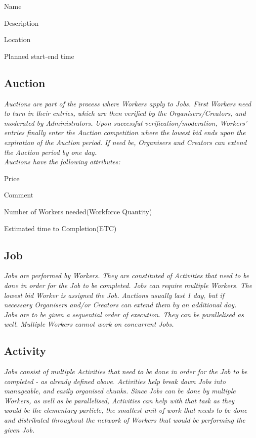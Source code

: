 		\begin{packed_enum}
			\item Name
			\item Description
			\item Location
			\item Planned start-end time
		\end{packed_enum}
		
		\subsection{Auction}
		\textit{Auctions are part of the process where Workers apply to Jobs. First Workers need to turn in their entries, which are then verified by the Organisers/Creators, and moderated by Administrators. Upon successful verification/moderation, Workers' entries finally enter the Auction
		competition where the lowest bid ends upon the expiration of the Auction period. If need be, Organisers and Creators can extend the Auction period by one day.}\\
	
		\textit{Auctions have the following attributes:}
		\begin{packed_enum}
			\item Price
			\item Comment
			\item Number of Workers needed(Workforce Quantity)
			\item Estimated time to Completion(ETC)
		\end{packed_enum}
	
		\subsection{Job}
		\textit{Jobs are performed by Workers. They are constituted of Activities that need to be done in order for the Job to be completed. Jobs can require multiple Workers. The lowest bid Worker is assigned the Job. Auctions usually last 1 day, but if necessary Organisers and/or Creators can extend them by an additional day.}\\
		
		\textit{Jobs are to be given a sequential order of execution. They can be parallelised as well. Multiple Workers cannot work on concurrent Jobs.}
		
		\subsection{Activity}
		\textit{Jobs consist of multiple Activities that need to be done in order for the Job to be completed - as already defined above. Activities help break down Jobs into manageable, and easily organised chunks. Since Jobs can be done by multiple Workers, as well as be parallelised, Activities can help with that task as they would be the elementary particle, the smallest unit of work that needs to be done and distributed throughout the network of Workers that would be performing the given Job.}
		
